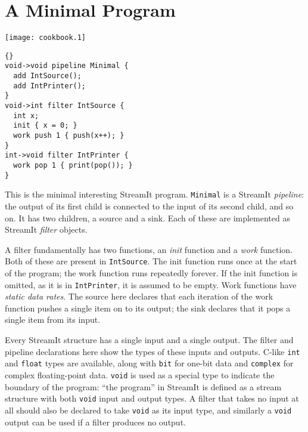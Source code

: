 \section{A Minimal Program}

\begin{textpic}{\texttt{[image: cookbook.1]}}
\begin{lstlisting}{}
void->void pipeline Minimal {
  add IntSource();
  add IntPrinter();
}
void->int filter IntSource {
  int x;
  init { x = 0; }
  work push 1 { push(x++); }
}
int->void filter IntPrinter {
  work pop 1 { print(pop()); }
}
\end{lstlisting}
\end{textpic}

This is the minimal interesting StreamIt program.  \lstinline|Minimal|
is a StreamIt \emph{pipeline}: the output of its first child is
connected to the input of its second child, and so on.  It has two
children, a source and a sink.  Each of these are implemented as
StreamIt \emph{filter} objects.

A filter fundamentally has two functions, an \emph{init} function and
a \emph{work} function.  Both of these are present in
\lstinline|IntSource|.  The init function runs once at the start of
the program; the work function runs repeatedly forever.  If the init
function is omitted, as it is in \lstinline|IntPrinter|, it is assumed
to be empty.  Work functions have \emph{static data rates}.  The
source here declares that each iteration of the work function pushes a
single item on to its output; the sink declares that it pops a single
item from its input.

Every StreamIt structure has a single input and a single output.  The
filter and pipeline declarations here show the types of these inputs
and outputs.  C-like \lstinline|int| and \lstinline|float| types are
available, along with \lstinline|bit| for one-bit data and
\lstinline|complex| for complex floating-point data.  \lstinline|void|
is used as a special type to indicate the boundary of the program:
``the program'' in StreamIt is defined as a stream structure with both
\lstinline|void| input and output types.  A filter that takes no input
at all should also be declared to take \lstinline|void| as its input
type, and similarly a \lstinline|void| output can be used if a filter
produces no output.

